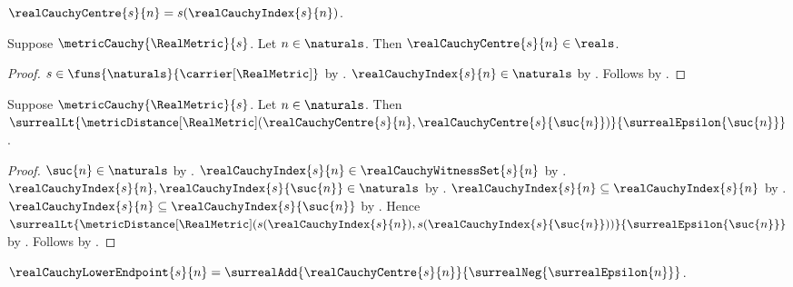 \begin{definition}\label{real_cauchy_centre}
    $\realCauchyCentre{s}{n}=s(\realCauchyIndex{s}{n})$.
\end{definition}

\begin{proposition}\label{real_cauchy_centre_is_real}
    Suppose $\metricCauchy{\RealMetric}{s}$.
    Let $n\in\naturals$.
    Then $\realCauchyCentre{s}{n}\in\reals$.
\end{proposition}
\begin{proof}
    $s\in\funs{\naturals}{\carrier[\RealMetric]}$
        by .
    $\realCauchyIndex{s}{n}\in\naturals$
        by .
    Follows by
        .
\end{proof}

\begin{proposition}\label{real_cauchy_centre_successor_distance}
    Suppose $\metricCauchy{\RealMetric}{s}$.
    Let $n\in\naturals$.
    Then
        $\surrealLt{
            \metricDistance[\RealMetric]
                (\realCauchyCentre{s}{n},
                 \realCauchyCentre{s}{\suc{n}})}
            {\surrealEpsilon{\suc{n}}}$.
\end{proposition}
\begin{proof}
    $\suc{n}\in\naturals$ by .
    $\realCauchyIndex{s}{n}\in\realCauchyWitnessSet{s}{n}$
        by .
    $\realCauchyIndex{s}{n},\realCauchyIndex{s}{\suc{n}}\in\naturals$
        by .
    $\realCauchyIndex{s}{n}\subseteq\realCauchyIndex{s}{n}$
        by .
    $\realCauchyIndex{s}{n}\subseteq
        \realCauchyIndex{s}{\suc{n}}$
        by .
    Hence
        $\surrealLt{
            \metricDistance[\RealMetric]
                (s(\realCauchyIndex{s}{n}),
                 s(\realCauchyIndex{s}{\suc{n}}))}
            {\surrealEpsilon{\suc{n}}}$
        by .
    Follows by .
\end{proof}

\begin{definition}\label{real_cauchy_lower_endpoint}
    $\realCauchyLowerEndpoint{s}{n}
        =\surrealAdd{\realCauchyCentre{s}{n}}
            {\surrealNeg{\surrealEpsilon{n}}}$.
\end{definition}

